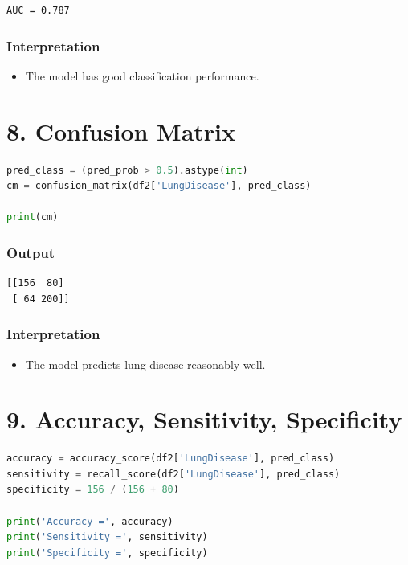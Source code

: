\documentclass[12pt]{article}
\begin{document}
\begin{verbatim}
AUC = 0.787
\end{verbatim}

\subsubsection*{Interpretation}

\begin{itemize}
\item The model has good classification performance.
\end{itemize}

\section*{8. Confusion Matrix}

\begin{lstlisting}[language=Python]
pred_class = (pred_prob > 0.5).astype(int)
cm = confusion_matrix(df2['LungDisease'], pred_class)

print(cm)
\end{lstlisting}

\subsubsection*{Output}

\begin{verbatim}
[[156  80]
 [ 64 200]]
\end{verbatim}

\subsubsection*{Interpretation}

\begin{itemize}
\item The model predicts lung disease reasonably well.
\end{itemize}

\section*{9. Accuracy, Sensitivity, Specificity}

\begin{lstlisting}[language=Python]
accuracy = accuracy_score(df2['LungDisease'], pred_class)
sensitivity = recall_score(df2['LungDisease'], pred_class)
specificity = 156 / (156 + 80)

print('Accuracy =', accuracy)
print('Sensitivity =', sensitivity)
print('Specificity =', specificity)
\end{lstlisting}
\end{document}
